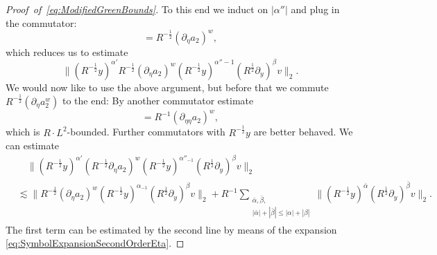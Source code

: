 \documentclass{amsart}
\theoremstyle{definition}
\begin{document}
\begin{proof}[Proof~of~\eqref{eq:ModifiedGreenBounds}]
To this end we induct on $|\alpha''|$ and plug in the commutator:
\begin{equation*}
[ a_2^w, R^{-\frac{1}{2}} y] = R^{-\frac{1}{2}} (\partial_{\eta} a_2)^w,
\end{equation*}
which reduces us to estimate
\begin{equation*}
\| (R^{-\frac{1}{2}} y)^{\alpha'} R^{-\frac{1}{2}} (\partial_{\eta} a_2)^w (R^{-\frac{1}{2}} y)^{\alpha''-1} (R^{\frac{1}{2}} \partial_y)^{\beta} v \|_2.
\end{equation*}
We would now like to use the above argument, but before that we commute \\ $R^{-\frac{1}{2}} (\partial_{\eta} a_2^w)$ to the end: By another commutator estimate
\begin{equation*}
[R^{-\frac{1}{2}} y, R^{-\frac{1}{2}} \partial_{\eta} a_2^w] = R^{-1} (\partial_{\eta \eta} a_2)^w,
\end{equation*}
which is $R \cdot L^2$-bounded. Further commutators with $R^{-\frac{1}{2}} y$ are better behaved. We can estimate
\begin{equation*}
\begin{split}
&\quad \| (R^{-\frac{1}{2}} y)^{\alpha'} (R^{-\frac{1}{2}} \partial_{\eta} a_2)^w (R^{-\frac{1}{2}} y)^{\alpha''_{-1}} (R^{\frac{1}{2}} \partial_y)^{\beta} v \|_2 \\ &\lesssim \| R^{-\frac{1}{2}} (\partial_{\eta} a_2)^w (R^{-\frac{1}{2}} y)^{\alpha_{-1}} (R^{\frac{1}{2}} \partial_y)^{\beta} v \|_2 + R^{-1} \sum_{\substack{\bar{\alpha},\bar{\beta}, \\ |\bar{\alpha}| + |\bar{\beta}| \leq |\alpha| + |\beta|}} \| (R^{-\frac{1}{2}} y)^{\bar{\alpha}} (R^{\frac{1}{2}} \partial_y)^{\bar{\beta}} v \|_2.
\end{split}
\end{equation*}
The first term can be estimated by the second line by means of the expansion \eqref{eq:SymbolExpansionSecondOrderEta}.


\end{proof}
\end{document}

